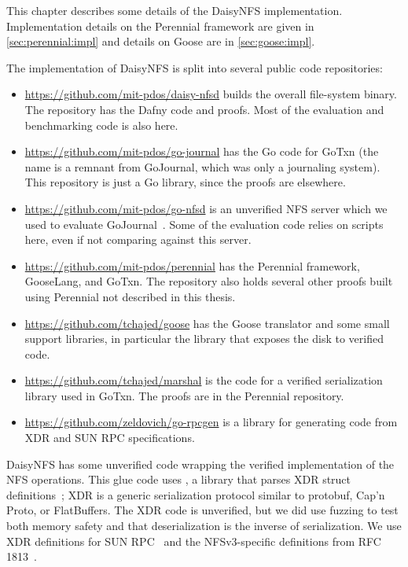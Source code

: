 This chapter describes some details of the DaisyNFS implementation.
Implementation details on the Perennial framework are given in
\cref{sec:perennial:impl} and details on Goose are in \cref{sec:goose:impl}.

The implementation of DaisyNFS is split into several public code repositories:
\begin{itemize}[noitemsep,topsep=0pt,parsep=0pt,partopsep=0pt]
  \item \url{https://github.com/mit-pdos/daisy-nfsd} builds the overall
        file-system binary. The repository has the Dafny code and proofs. Most
        of the evaluation and benchmarking code is also here.
  \item \url{https://github.com/mit-pdos/go-journal} has the Go code for GoTxn
        (the name is a remnant from GoJournal, which was only a journaling
        system). This repository is just a Go library, since the proofs are
        elsewhere.
  \item \url{https://github.com/mit-pdos/go-nfsd} is an unverified NFS server
        which we used to evaluate GoJournal~\cite{chajed:gojournal}. Some of the
        evaluation code relies on scripts here, even if not comparing against
        this server.
  \item \url{https://github.com/mit-pdos/perennial} has the Perennial framework,
        GooseLang, and GoTxn. The repository also holds several other proofs
        built using Perennial not described in this thesis.
  \item \url{https://github.com/tchajed/goose} has the Goose translator and some
        small support libraries, in particular the library that exposes the disk
        to verified code.
  \item \url{https://github.com/tchajed/marshal} is the code for a verified
        serialization library used in GoTxn. The proofs are in the Perennial
        repository.
  \item \url{https://github.com/zeldovich/go-rpcgen} is a library for generating
        code from XDR and SUN RPC specifications.
\end{itemize}

DaisyNFS has some unverified code wrapping the verified implementation of the
NFS operations. This glue code uses , a library that parses XDR
struct definitions~\cite{RFC:4506}; XDR is a generic serialization protocol
similar to protobuf, Cap'n Proto, or FlatBuffers. The XDR code is unverified,
but we did use fuzzing to test both memory safety and that deserialization is
the inverse of serialization. We use XDR definitions for SUN RPC~\cite{RFC:1057}
and the NFSv3-specific definitions from RFC 1813~\cite{RFC:1813}.

